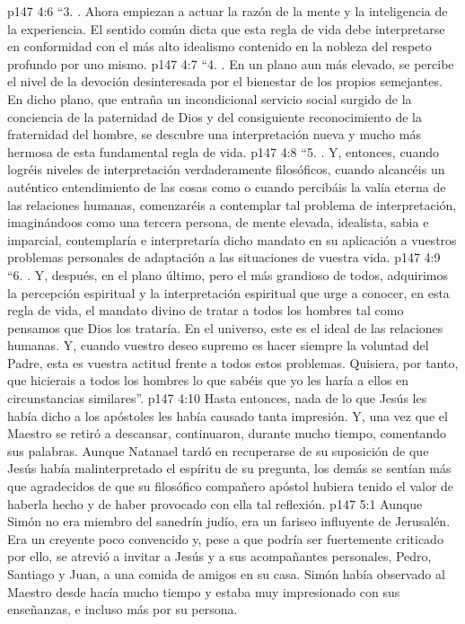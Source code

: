 \vs p147 4:6 \pc “3. . Ahora empiezan a actuar la razón de la mente y la inteligencia de la experiencia. El sentido común dicta que esta regla de vida debe interpretarse en conformidad con el más alto idealismo contenido en la nobleza del respeto profundo por uno mismo.
\vs p147 4:7 \pc “4. . En un plano aun más elevado, se percibe el nivel de la devoción desinteresada por el bienestar de los propios semejantes. En dicho plano, que entraña un incondicional servicio social surgido de la conciencia de la paternidad de Dios y del consiguiente reconocimiento de la fraternidad del hombre, se descubre una interpretación nueva y mucho más hermosa de esta fundamental regla de vida.
\vs p147 4:8 \pc “5. . Y, entonces, cuando logréis niveles de interpretación verdaderamente filosóficos, cuando alcancéis un auténtico entendimiento de las cosas como  o  cuando percibáis la valía eterna de las relaciones humanas, comenzaréis a contemplar tal problema de interpretación, imaginándoos como una tercera persona, de mente elevada, idealista, sabia e imparcial, contemplaría e interpretaría dicho mandato en su aplicación a vuestros problemas personales de adaptación a las situaciones de vuestra vida.
\vs p147 4:9 \pc “6. . Y, después, en el plano último, pero el más grandioso de todos, adquirimos la percepción espiritual y la interpretación espiritual que urge a conocer, en esta regla de vida, el mandato divino de tratar a todos los hombres tal como pensamos que Dios los trataría. En el universo, este es el ideal de las relaciones humanas. Y, cuando vuestro deseo supremo es hacer siempre la voluntad del Padre, esta es vuestra actitud frente a todos estos problemas. Quisiera, por tanto, que hicierais a todos los hombres lo que sabéis que yo les haría a ellos en circunstancias similares”.
\vs p147 4:10 \pc Hasta entonces, nada de lo que Jesús les había dicho a los apóstoles les había causado tanta impresión. Y, una vez que el Maestro se retiró a descansar, continuaron, durante mucho tiempo, comentando sus palabras. Aunque Natanael tardó en recuperarse de su suposición de que Jesús había malinterpretado el espíritu de su pregunta, los demás se sentían más que agradecidos de que su filosófico compañero apóstol hubiera tenido el valor de haberla hecho y de haber provocado con ella tal reflexión.
\vs p147 5:1 Aunque Simón no era miembro del sanedrín judío, era un fariseo influyente de Jerusalén. Era un creyente poco convencido y, pese a que podría ser fuertemente criticado por ello, se atrevió a invitar a Jesús y a sus acompañantes personales, Pedro, Santiago y Juan, a una comida de amigos en su casa. Simón había observado al Maestro desde hacía mucho tiempo y estaba muy impresionado con sus enseñanzas, e incluso más por su persona.
